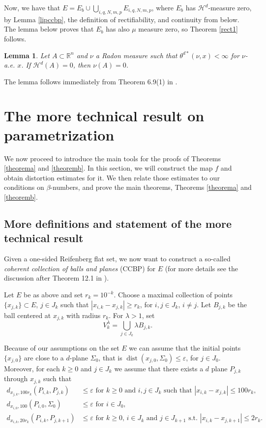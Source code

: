 \documentclass[11pt, twoside, leqno]{article}
\numberwithin{equation}{section}
\theoremstyle{plain}
\newtheorem{lem}[thm]{Lemma}
\theoremstyle{definition}
\newcommand{\R}{\mathbb{R}}
\newcommand{\e}{\varepsilon} %
\newcommand{\dist}{\operatorname{dist}}
\begin{document}
Now, we have that $E=E_b \cup \bigcup_{i,q,N,m,p} E_{i,q,N,m,p}$, where $E_b$ has $\mathcal{H}^d$-measure zero, by Lemma \ref{lipccbp}, the definition of rectifiability, and continuity from below. The lemma below proves that $E_b$ has also $\mu$ measure zero, so Theorem \ref{rect1} follows.

\begin{lem}
Let $A \subset \R^n$ and $\nu$ a Radon measure such that $\theta^{d *}(\nu,x)<\infty$ for $\nu$-a.e. $x$. If $\mathcal{H}^d(A)=0$, then $\nu(A)=0$.
\end{lem}
The lemma follows immediately from Theorem 6.9(1) in \cite{mattila}. 

\section{The more technical result on parametrization} \label{prelim}

We now proceed to introduce the main tools for the proofs of Theorems \ref{theorema} and \ref{theoremb}. In this section, we will construct the map $f$ and obtain distortion estimates for it. We then relate those estimates to our conditions on $\beta$-numbers, and prove the main theorems, Theorems \ref{theorema} and \ref{theoremb}.

\subsection{More definitions and statement of the more technical result}

Given a one-sided Reifenberg flat set, we now want to construct a so-called \emph{coherent collection of balls and planes} (CCBP) for $E$ (for more details see the discussion after Theorem 12.1 in \cite{davidtoro}).

Let $E$ be as above and set $r_k=10^{-k}$. Choose a maximal collection of points $\{x_{j,k}\} \subset E$, $j \in J_k$ such that $|x_{i,k}-x_{j,k}| \geq r_k$, for $i,j \in J_k$, $i \neq j$. Let $B_{j,k}$ be the ball centered at $x_{j,k}$ with radius $r_k$. For $\lambda > 1$, set 
\begin{equation}
V_k^{\lambda}=\bigcup_{j \in J_k} \lambda B_{j,k}.
\end{equation}

Because of our assumptions on the set $E$ we can assume that the initial points $\{x_{j,0}\}$ are close to a $d$-plane $\Sigma_0$, that is $\dist(x_{j,0}, \Sigma_0) \leq \e$, for $j \in J_0$.
Moreover, for each $k \geq 0$ and $j \in J_k$ we assume that there exists a $d$ plane $P_{j,k}$ through $x_{j,k}$ such that
\begin{align} 
 d_{x_{j,k}, 100r_k}(P_{i,k}, P_{j,k}) & \leq \e \text{ for $k \geq 0$ and $i,j \in J_k$ such that $|x_{i,k}-x_{j,k}| \leq 100r_k$,}  \label{ccbp1} \\
 d_{x_{i,0},100}(P_{i,0},\Sigma_0) & \leq \e \text{ for $i \in J_0$,} \\
 d_{x_{i,k},20r_k}(P_{i,k},P_{j,k+1})&  \leq \e \text{ for $k \geq 0$, $i \in J_k$ and $j \in J_{k+1}$ s.t. $|x_{i,k}-x_{j,k+1}| \leq 2r_k$.}
\end{align}
\end{document}
